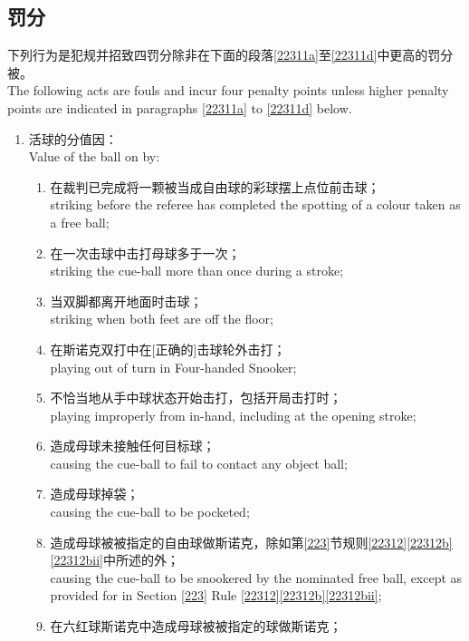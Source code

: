 \subsection{罚分}\label{22311}

\noindent 下列行为是犯规并招致四罚分除非在下面的段落\ref{22311a}至\ref{22311d}中更高的罚分被\indicate{}。\\
The following acts are fouls and incur four penalty points unless higher penalty points are indicated in paragraphs \ref{22311a} to \ref{22311d} below.
\begin{enumerate}[label=(\alph*),start=1]
    \item \label{22311a}活球的分值因：\\
    Value of the ball on by:
    \begin{enumerate}[label=(\roman*)]
        \item \label{22311ai}在裁判已完成将一颗被当成自由球的彩球摆上点位前击球；\\
        striking before the referee has completed the spotting of a colour taken as a free ball;
        \item 在一次击球中击打母球多于一次；\\
        striking the cue-ball more than once during a stroke;
        \item \label{22311aiii}当双脚都离开地面时击球；\\
        striking when both feet are off the floor;
        \item 在斯诺克双打中在[正确的]击球轮外击打；\\
        playing out of turn in Four-handed Snooker;
        \item 不恰当地从手中球状态开始击打，包括开局击打时；\\
        playing improperly from in-hand, including at the opening stroke;
        \item 造成母球未接触任何目标球；\\
        causing the cue-ball to fail to contact any object ball;
        \item 造成母球掉袋；\\
        causing the cue-ball to be pocketed;
        \item 造成母球被被指定的自由球做斯诺克，除如第\ref{223}节规则\ref{22312}\ref{22312b}\ref{22312bii}中所述的外；\\
        causing the cue-ball to be snookered by the nominated free ball, except as provided for in Section \ref{223} Rule \ref{22312}\ref{22312b}\ref{22312bii};
        \item 在六红球斯诺克中造成母球被被指定的球做斯诺克；\\

\end{enumerate}
\end{enumerate}
